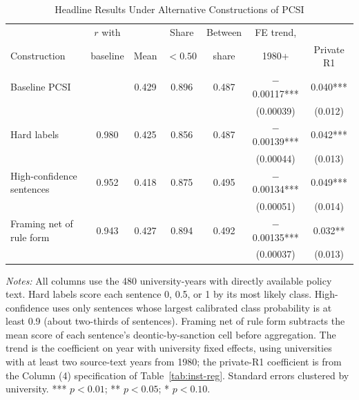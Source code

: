 \begin{table}[htbp]
\centering
\footnotesize
\caption{Headline Results Under Alternative Constructions of PCSI}
\label{tab:alternatives}
\begin{threeparttable}
\begin{tabular}{lcccccc}
\toprule
 & $r$ with & & Share & Between & FE trend, & \\
Construction & baseline & Mean & $<0.50$ & share & 1980+ & Private R1 \\
\midrule
Baseline PCSI &  & 0.429 & 0.896 & 0.487 & $-$0.00117*** & 0.040*** \\
 & & & & & (0.00039) & (0.012) \\
Hard labels & 0.980 & 0.425 & 0.856 & 0.487 & $-$0.00139*** & 0.042*** \\
 & & & & & (0.00044) & (0.013) \\
High-confidence sentences & 0.952 & 0.418 & 0.875 & 0.495 & $-$0.00134*** & 0.049*** \\
 & & & & & (0.00051) & (0.014) \\
Framing net of rule form & 0.943 & 0.427 & 0.894 & 0.492 & $-$0.00135*** & 0.032** \\
 & & & & & (0.00037) & (0.013) \\
\bottomrule
\end{tabular}
\begin{tablenotes}[flushleft]\footnotesize
\item \textit{Notes:} All columns use the 480 university-years with directly available policy text. Hard labels score each sentence 0, 0.5, or 1 by its most likely class. High-confidence uses only sentences whose largest calibrated class probability is at least 0.9 (about two-thirds of sentences). Framing net of rule form subtracts the mean score of each sentence's deontic-by-sanction cell before aggregation. The trend is the coefficient on year with university fixed effects, using universities with at least two source-text years from 1980; the private-R1 coefficient is from the Column (4) specification of Table~\ref{tab:inst-reg}. Standard errors clustered by university. *** $p<0.01$; ** $p<0.05$; * $p<0.10$.
\end{tablenotes}
\end{threeparttable}
\end{table}
